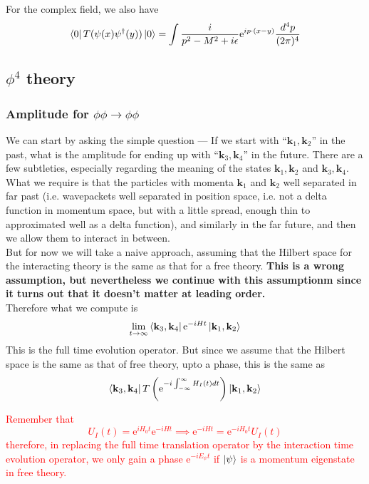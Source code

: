 \documentclass[11pt, notitlepage]{report}
\newcommand{\e}{\mathrm{e}}
\numberwithin{equation}{section}
\begin{document}
    For the complex field, we also have 
    \begin{equation*}
        \bra{0} T ( \psi(x) \psi^\dagger(y) )\ket{0} = \int \frac{i}{p^2 - M^2 + i\epsilon} \e^{ip\cdot(x-y)} \frac{d^4p}{(2\pi)^4}
    \end{equation*}

    \subsection{\(\phi^4\) theory}
    \subsubsection{Amplitude for \(\phi\phi \to \phi\phi\)}
    We can start by asking the simple question — If we start with ``\(\textbf{k}_1,\textbf{k}_2\)'' in the past, what is the amplitude for ending up with ``\(\textbf{k}_3, \textbf{k}_4\)'' in the future. There are a few subtleties, especially regarding the meaning of the states \(\textbf{k}_1,\textbf{k}_2\) and \(\textbf{k}_3, \textbf{k}_4\). What we require is that the particles with momenta \(\textbf{k}_1\) and \(\textbf{k}_2\) well separated in far past (i.e. wavepackets well separated in position space, i.e. not a delta function in momentum space, but with a little spread, enough thin to approximated well as a delta function), and similarly in the far future, and then we allow them to interact in between. \\
    But for now we will take a naive approach, assuming that the Hilbert space for the interacting theory is the same as that for a free theory. \textbf{This is a wrong assumption, but nevertheless we continue with this assumptionm since it turns out that it doesn't matter at leading order.}\\ 
    Therefore what we compute is 
    \begin{equation*}
        \lim_{t\to \infty}\bra{\textbf{k}_3, \textbf{k}_4} \e^{-iHt} \ket{\textbf{k}_1, \textbf{k}_2}
    \end{equation*}
    This is the full time evolution operator. But since we assume that the Hilbert space is the same as that of free theory, upto a phase, this is the same as 
    \begin{equation*}
        \bra{\textbf{k}_3, \textbf{k}_4} T\left(\e^{-i\int_{-\infty}^{\infty}H_I(t) dt }\right) \ket{\textbf{k}_1, \textbf{k}_2}
    \end{equation*}

    \textcolor{red}{
    Remember that 
    \begin{equation*}
        U_I(t) = \e^{iH_0t }\e^{-iHt} \implies \e^{-iHt} = \e^{-iH_0t} U_I(t)
    \end{equation*}
    therefore, in replacing the full time translation operator by the interaction time evolution operator, we only gain a phase \(\e^{-iE_\psi t}\) if \(\ket{\psi}\) is a momentum eigenstate in free theory.\\
    }
\end{document}
